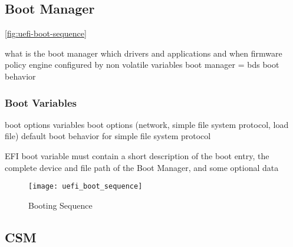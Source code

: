 \subsection{Boot Manager}

\autoref{fig:uefi-boot-sequence}

what is the boot manager
which drivers and applications and when
firmware policy engine
configured by non volatile variables
\cite[3.1.]{uefi-spec}
boot manager = bds
boot behavior
\subsubsection{Boot Variables}
\label{sec:uefi-pi:uefi:boot-manager:boot-variables}
boot options variables
boot options (network, simple file system protocol, load file)
default boot behavior for simple file system protocol

EFI boot variable must contain a short description of the boot entry, the complete
device and file path of the Boot Manager, and some optional data
\cite{windows-internals-7-part2}

\begin{figure}[htb]%
    \centering%
    \texttt{[image: uefi\_boot\_sequence]}%
    \caption{Booting Sequence\cite[Figure 2-1]{uefi-spec}}%
    \label{fig:uefi-boot-sequence}%
\end{figure}

\subsection{\ac{CSM}}


